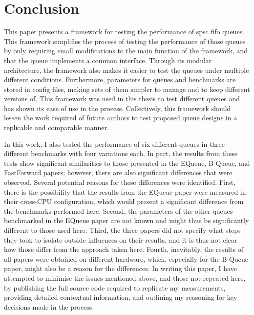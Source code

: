\chapter{Conclusion}
This paper presents a framework for testing the performance of \acrshort{spsc} \acrshort{fifo} queues.
This framework simplifies the process of testing the performance of those queues by only requiring small
modifications to the main function of the framework, and that the queue implements a common interface.
Through its modular architecture, the framework also makes it easier to test the queues under multiple
different conditions.
Furthermore, parameters for queues and benchmarks are stored in config files, making sets of them simpler to
manage and to keep different versions of.
This framework was used in this thesis to test different queues and has shown its ease of use in the process.
Collectively, this framework should lessen the work required of future authors to test proposed queue designs
in a replicable and comparable manner.

In this work, I also tested the performance of six different queues in three different benchmarks with four
variations each.
In part, the results from these tests show significant similarities to those presented in the EQueue,
B-Queue, and FastForward papers; however, there are also significant differences that were
observed\cite{EQueue,B-Queue,FastForward}.
Several potential reasons for these differences were identified.
First, there is the possibility that the results from the EQueue paper were measured in their cross-CPU
configuration, which would present a significant difference from the benchmarks performed here.
Second, the parameters of the other queues benchmarked in the EQueue paper are not known and might thus be
significantly different to those used here.
Third, the three papers did not specify what steps they took to isolate outside influences on their results,
and it is thus not clear how those differ from the approach taken here.
Fourth, inevitably, the results of all papers were obtained on different hardware, which, especially for the
B-Queue paper, might also be a reason for the differences.
In writing this paper, I have attempted to minimise the issues mentioned above, and those not repeated here,
by publishing the full source code required to replicate my measurements, providing detailed contextual
information, and outlining my reasoning for key decisions made in the process.

